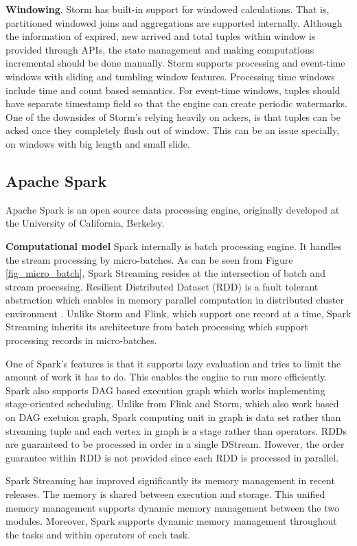 \textbf{Windowing}.
Storm has built-in support for windowed calculations. That is, partitioned windowed joins and aggregations are supported internally.  Although the information of expired, new arrived and total tuples within window is provided through APIs, the state management and making computations incremental  should be done manually. Storm supports processing and event-time windows with sliding and tumbling window features. Processing time windows include time and count based semantics. For event-time windows, tuples should have separate timestamp field so that the engine can create periodic watermarks. One of the downsides of Storm's relying heavily on ackers, is that tuples can be acked once they completely flush out of window. This can be an issue specially, on windows with big length and small slide.  



\subsection{Apache Spark}
Apache Spark is an open source data processing engine, originally developed at the University of California, Berkeley. 

\textbf{Computational model}
Spark internally is batch processing engine. It handles the stream processing by micro-batches. As can be seen from Figure \ref{fig_micro_batch},  Spark Streaming resides at the intersection of batch and stream processing.  Resilient Distributed Dataset (RDD) is a fault tolerant abstraction which enables in memory parallel computation in  distributed cluster environment \cite{zaharia2012resilient}. Unlike Storm and Flink, which support one record at a time, Spark Streaming inherits its architecture from batch processing which support processing records in micro-batches. 

One of Spark's features is that it supports lazy evaluation and tries to  limit the amount of work it has to do. This enables the engine to run more efficiently. Spark also supports DAG based execution graph which works implementing  stage-oriented scheduling. Unlike from Flink and Storm, which also work based on DAG exetuion graph, Spark computing unit in graph is data set rather than streaming tuple and each vertex in graph is a stage rather than operators. RDDs are guaranteed to be processed in order in a single DStream. However, the order guarantee within RDD is not provided since each RDD is processed in parallel. 

Spark Streaming has improved significantly its memory management in recent releases.  The memory is shared between execution and storage. This unified memory management supports dynamic memory management between the two modules. Moreover, Spark supports dynamic memory management throughout the tasks and within operators of each task. 

